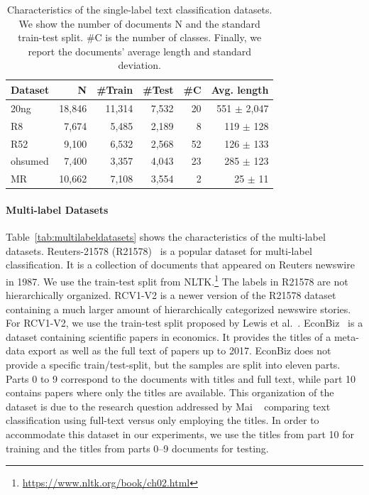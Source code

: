 \documentclass[acmsmall,nonacm]{acmart}
\begin{document}
\begin{table}[ht]
    \centering
    \caption{Characteristics of the single-label text classification datasets. 
    We show the number of documents N and
    the standard train-test split.
    \#C is the number of classes.
    Finally, we report the documents' average length and standard deviation.
    }
    \label{tab:datasets}
    \begin{tabular}{lrrrrr}
    \toprule
    \textbf{Dataset} & \textbf{N}       & \textbf{\#Train} & \textbf{\#Test}  & \textbf{\#C} & \textbf{Avg. length}   \\
    \midrule                                                              
    20ng    & 18,846  & 11,314  & 7,532   & 20        & 551 $\pm$ 2,047 \\
    R8      & 7,674   & 5,485   & 2,189   & 8         & 119 $\pm$ 128   \\
    R52     & 9,100   & 6,532   & 2,568   & 52        & 126 $\pm$ 133   \\
    ohsumed & 7,400   & 3,357   & 4,043   & 23        & 285 $\pm$ 123   \\
    MR      & 10,662  & 7,108   & 3,554   & 2         & 25 $\pm$ 11     \\
    \bottomrule
    \end{tabular}
\end{table}

\paragraph{Multi-label Datasets}
\label{sec:multi-label-datasets}
Table~\ref{tab:multilabeldatasets} shows the characteristics of the multi-label datasets.
Reuters-21578 (R21578)~\cite{reuters} is a popular dataset for multi-label classification. It is a collection of documents that appeared on Reuters newswire in 1987. We use the train-test split from NLTK.\footnote{\url{https://www.nltk.org/book/ch02.html}}
The labels in R21578 are not hierarchically organized.
RCV1-V2 is a newer version of the R21578 dataset containing a much larger amount of hierarchically categorized newswire stories. 
For RCV1-V2, we use the train-test split proposed by Lewis et al.~\cite{rcv1-v2}. 
EconBiz~\cite{DBLP:conf/jcdl/MaiGS18} is a dataset containing scientific papers in economics.
It provides the titles of a meta-data export as well as the full text of papers up to 2017. 
EconBiz does not provide a specific train/test-split, but the samples are split into eleven parts. 
Parts 0 to 9 correspond to the documents with titles and full text, while part 10 contains papers where only the titles are available.
This organization of the dataset is due to the research question addressed by Mai \etal~\cite{DBLP:conf/jcdl/MaiGS18} comparing text classification using full-text versus only employing the titles.
In order to accommodate this dataset in our experiments, we use the titles from part 10 for training and the titles from parts 0--9 documents for testing. 
\end{document}
